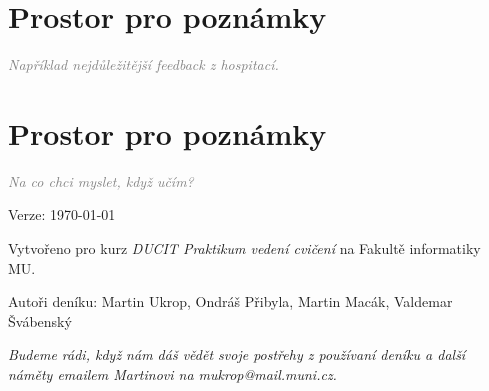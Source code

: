 \documentclass[twoside,openany]{book}
\newcommand{\note}[1]{\textcolor{gray}{\small\itshape #1}}
\begin{document}
\chapter*{Prostor pro poznámky}
\note{Například nejdůležitější feedback z hospitací.}

\chapter*{Prostor pro poznámky}
\note{Na co chci myslet, když učím?}

\newpage
\vspace*{\fill}
Verze: \today

Vytvořeno pro kurz \textit{DUCIT Praktikum vedení cvičení} na Fakultě informatiky MU.

Autoři deníku: Martin Ukrop, Ondráš Přibyla, Martin Macák, Valdemar Švábenský

\textit{Budeme rádi, když nám dáš vědět svoje postřehy z používaní deníku a další náměty emailem Martinovi na mukrop@mail.muni.cz.}
\end{document}
